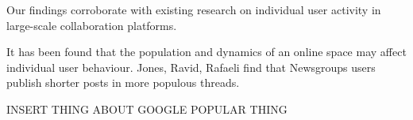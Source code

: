 Our findings corroborate with existing research on individual user
activity in large-scale collaboration platforms. 

It has been found that the population and dynamics of an online space
may affect individual user behaviour. Jones, Ravid, Rafaeli find that
Newsgroups users publish shorter posts in more populous threads.

INSERT THING ABOUT GOOGLE POPULAR THING






